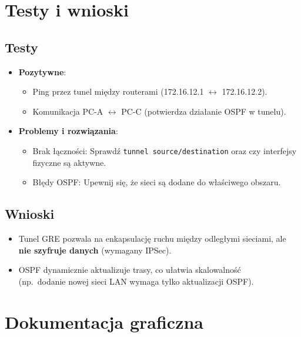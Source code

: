 \documentclass[12pt,twoside,a4paper,openany]{article}
\begin{document}
\section{Testy i wnioski}

\subsection{Testy}

\begin{itemize}    \item \textbf{Pozytywne}:
    \begin{itemize}
        \item Ping przez tunel między routerami (172.16.12.1 $\leftrightarrow$ 172.16.12.2).
        \item Komunikacja PC-A $\leftrightarrow$ PC-C (potwierdza działanie OSPF w tunelu).
    \end{itemize}
    \item \textbf{Problemy i rozwiązania}:
    \begin{itemize}        \item Brak łączności: Sprawdź \texttt{tunnel source/destination} oraz czy interfejsy fizyczne są aktywne.
        \item Błędy OSPF: Upewnij się, że sieci są dodane do właściwego obszaru.
    \end{itemize}
\end{itemize}

\subsection{Wnioski}
\begin{itemize}
    \item Tunel GRE pozwala na enkapsulację ruchu między odległymi sieciami, ale \textbf{nie szyfruje danych} (wymagany IPSec).
    \item OSPF dynamicznie aktualizuje trasy, co ułatwia skalowalność\\ (np.\ dodanie nowej sieci LAN wymaga tylko aktualizacji OSPF).
\end{itemize}

\section{Dokumentacja graficzna}

\clearpage
\end{document}
